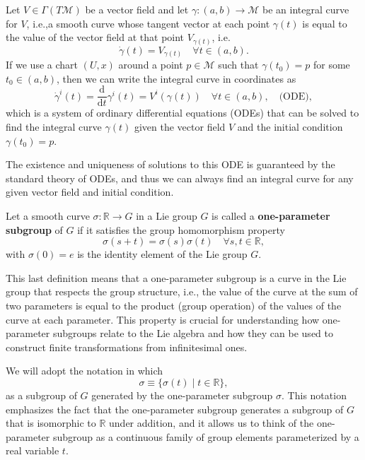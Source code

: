 \begin{definition}
    Let \(V \in \Gamma(T \mathcal{M})\) be a vector field and let \(\gamma: (a,b) \to \mathcal{M}\) be an integral curve for \(V\), i.e.,a smooth curve whose tangent vector at each point \(\gamma(t)\) is equal to the value of the vector field at that point \(V_{\gamma(t)}\), i.e.
    \[
        \dot{\gamma}(t) = V_{\gamma(t)} \quad \forall t \in (a,b).
    \]
    If we use a chart \((U,x)\) around a point \(p \in \mathcal{M}\) such that \(\gamma(t_0) = p\) for some \(t_0 \in (a,b)\), then we can write the integral curve in coordinates as
    \[
        \dot{\gamma}^i(t) = \frac{\mathrm{d}}{\mathrm{d}t} \gamma^i(t) = V^i(\gamma(t)) \quad \forall t \in (a,b), \quad \text{(ODE)},
    \]
    which is a system of ordinary differential equations (ODEs) that can be solved to find the integral curve \(\gamma(t)\) given the vector field \(V\) and the initial condition \(\gamma(t_0) = p\).
\end{definition}

The existence and uniqueness of solutions to this ODE is guaranteed by the standard theory of ODEs, and thus we can always find an integral curve for any given vector field and initial condition.

\begin{definition}
    Let a smooth curve \(\sigma : \mathbb{R} \to G\) in a Lie group \(G\) is called a \textbf{one-parameter subgroup} of \(G\) if it satisfies the group homomorphism property
    \[
        \sigma(s+t) = \sigma(s) \sigma(t) \quad \forall s,t \in \mathbb{R},
    \]
    with \(\sigma(0) = e\) is the identity element of the Lie group \(G\).
\end{definition}

This last definition means that a one-parameter subgroup is a curve in the Lie group that respects the group structure, i.e., the value of the curve at the sum of two parameters is equal to the product (group operation) of the values of the curve at each parameter. This property is crucial for understanding how one-parameter subgroups relate to the Lie algebra and how they can be used to construct finite transformations from infinitesimal ones.

We will adopt the notation in which
\[
    \sigma \equiv \{\sigma(t) \mid t \in \mathbb{R}\},
\]
as a subgroup of \(G\) generated by the one-parameter subgroup \(\sigma\). This notation emphasizes the fact that the one-parameter subgroup generates a subgroup of \(G\) that is isomorphic to \(\mathbb{R}\) under addition, and it allows us to think of the one-parameter subgroup as a continuous family of group elements parameterized by a real variable \(t\).

